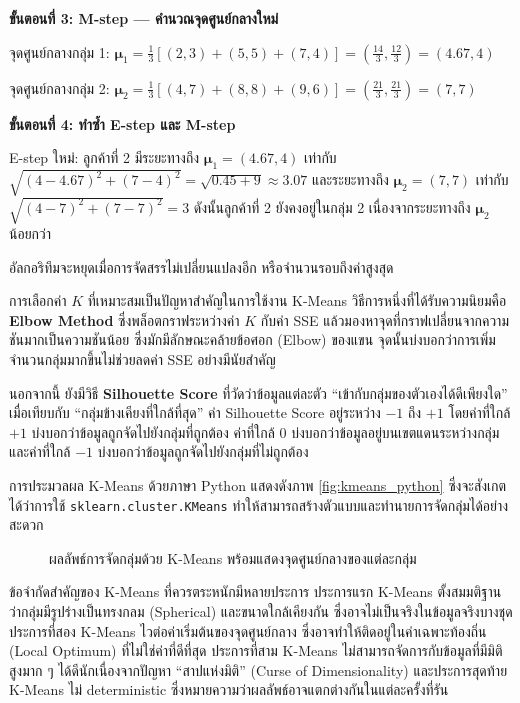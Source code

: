 \begin{exmp}
\textbf{ขั้นตอนที่ 3: M-step --- คำนวณจุดศูนย์กลางใหม่}

จุดศูนย์กลางกลุ่ม 1: $\boldsymbol{\mu}_1 = \frac{1}{3}[(2,3) + (5,5) + (7,4)] = \left(\frac{14}{3}, \frac{12}{3}\right) = (4.67, 4)$

จุดศูนย์กลางกลุ่ม 2: $\boldsymbol{\mu}_2 = \frac{1}{3}[(4,7) + (8,8) + (9,6)] = \left(\frac{21}{3}, \frac{21}{3}\right) = (7, 7)$

\textbf{ขั้นตอนที่ 4: ทำซ้ำ E-step และ M-step}

E-step ใหม่: ลูกค้าที่ 2 มีระยะทางถึง $\boldsymbol{\mu}_1 = (4.67, 4)$ เท่ากับ $\sqrt{(4-4.67)^2 + (7-4)^2} = \sqrt{0.45 + 9} \approx 3.07$ และระยะทางถึง $\boldsymbol{\mu}_2 = (7, 7)$ เท่ากับ $\sqrt{(4-7)^2 + (7-7)^2} = 3$ ดังนั้นลูกค้าที่ 2 ยังคงอยู่ในกลุ่ม 2 เนื่องจากระยะทางถึง $\boldsymbol{\mu}_2$ น้อยกว่า

อัลกอริทึมจะหยุดเมื่อการจัดสรรไม่เปลี่ยนแปลงอีก หรือจำนวนรอบถึงค่าสูงสุด
\end{exmp}

การเลือกค่า $K$ ที่เหมาะสมเป็นปัญหาสำคัญในการใช้งาน K-Means วิธีการหนึ่งที่ได้รับความนิยมคือ \textbf{Elbow Method} ซึ่งพล็อตกราฟระหว่างค่า $K$ กับค่า SSE แล้วมองหาจุดที่กราฟเปลี่ยนจากความชันมากเป็นความชันน้อย ซึ่งมักมีลักษณะคล้ายข้อศอก (Elbow) ของแขน จุดนั้นบ่งบอกว่าการเพิ่มจำนวนกลุ่มมากขึ้นไม่ช่วยลดค่า SSE อย่างมีนัยสำคัญ

นอกจากนี้ ยังมีวิธี \textbf{Silhouette Score} ที่วัดว่าข้อมูลแต่ละตัว ``เข้ากับกลุ่มของตัวเองได้ดีเพียงใด'' เมื่อเทียบกับ ``กลุ่มข้างเคียงที่ใกล้ที่สุด'' ค่า Silhouette Score อยู่ระหว่าง $-1$ ถึง $+1$ โดยค่าที่ใกล้ $+1$ บ่งบอกว่าข้อมูลถูกจัดไปยังกลุ่มที่ถูกต้อง ค่าที่ใกล้ $0$ บ่งบอกว่าข้อมูลอยู่บนเขตแดนระหว่างกลุ่ม และค่าที่ใกล้ $-1$ บ่งบอกว่าข้อมูลถูกจัดไปยังกลุ่มที่ไม่ถูกต้อง

การประมวลผล K-Means ด้วยภาษา Python แสดงดังภาพ \ref{fig:kmeans_python} ซึ่งจะสังเกตได้ว่าการใช้ \texttt{sklearn.cluster.KMeans} ทำให้สามารถสร้างตัวแบบและทำนายการจัดกลุ่มได้อย่างสะดวก

\begin{figure}[h]
    \centering
    \caption{ผลลัพธ์การจัดกลุ่มด้วย K-Means พร้อมแสดงจุดศูนย์กลางของแต่ละกลุ่ม}
    \label{fig:kmeans_result}
\end{figure}

ข้อจำกัดสำคัญของ K-Means ที่ควรตระหนักมีหลายประการ ประการแรก K-Means ตั้งสมมติฐานว่ากลุ่มมีรูปร่างเป็นทรงกลม (Spherical) และขนาดใกล้เคียงกัน ซึ่งอาจไม่เป็นจริงในข้อมูลจริงบางชุด ประการที่สอง K-Means ไวต่อค่าเริ่มต้นของจุดศูนย์กลาง ซึ่งอาจทำให้ติดอยู่ในค่าเฉพาะท้องถิ่น (Local Optimum) ที่ไม่ใช่ค่าที่ดีที่สุด ประการที่สาม K-Means ไม่สามารถจัดการกับข้อมูลที่มีมิติสูงมาก ๆ ได้ดีนักเนื่องจากปัญหา ``สาปแห่งมิติ'' (Curse of Dimensionality) และประการสุดท้าย K-Means ไม่ deterministic ซึ่งหมายความว่าผลลัพธ์อาจแตกต่างกันในแต่ละครั้งที่รัน

